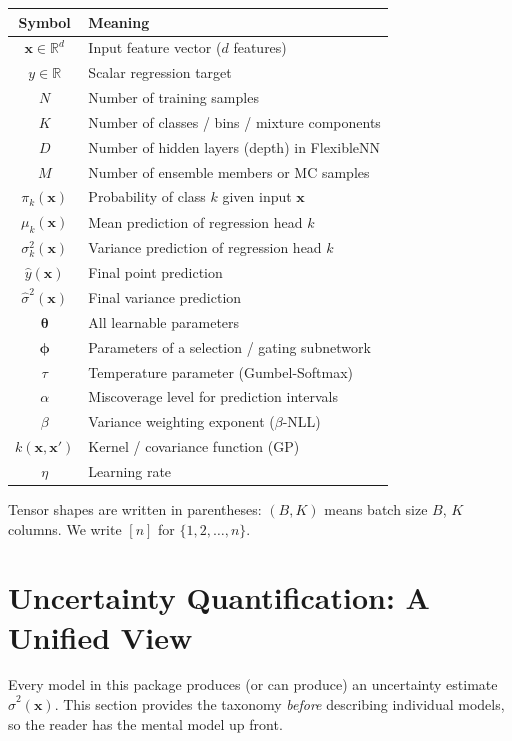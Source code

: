 \documentclass[11pt,a4paper]{article}
\theoremstyle{definition}
\newcommand{\R}{\mathbb{R}}
\newcommand{\bx}{\mathbf{x}}
\newcommand{\btheta}{\boldsymbol{\theta}}
\newcommand{\bphi}{\boldsymbol{\phi}}
\begin{document}
\begin{center}
\begin{tabular}{cl}
\toprule
Symbol & Meaning \\
\midrule
$\bx \in \R^d$ & Input feature vector ($d$ features) \\
$y \in \R$ & Scalar regression target \\
$N$ & Number of training samples \\
$K$ & Number of classes / bins / mixture components \\
$D$ & Number of hidden layers (depth) in FlexibleNN \\
$M$ & Number of ensemble members or MC samples \\
$\pi_k(\bx)$ & Probability of class $k$ given input $\bx$ \\
$\mu_k(\bx)$ & Mean prediction of regression head $k$ \\
$\sigma_k^2(\bx)$ & Variance prediction of regression head $k$ \\
$\hat{y}(\bx)$ & Final point prediction \\
$\hat{\sigma}^2(\bx)$ & Final variance prediction \\
$\btheta$ & All learnable parameters \\
$\bphi$ & Parameters of a selection / gating subnetwork \\
$\tau$ & Temperature parameter (Gumbel-Softmax) \\
$\alpha$ & Miscoverage level for prediction intervals \\
$\beta$ & Variance weighting exponent ($\beta$-NLL) \\
$k(\bx, \bx')$ & Kernel / covariance function (GP) \\
$\eta$ & Learning rate \\
\bottomrule
\end{tabular}
\end{center}

Tensor shapes are written in parentheses: $(B, K)$ means batch size $B$, $K$
columns. We write $[n]$ for $\{1, 2, \ldots, n\}$.

\section{Uncertainty Quantification: A Unified View}
\label{sec:uq}

Every model in this package produces (or can produce) an uncertainty estimate
$\hat{\sigma}^2(\bx)$. This section provides the taxonomy \emph{before}
describing individual models, so the reader has the mental model up front.
\end{document}
